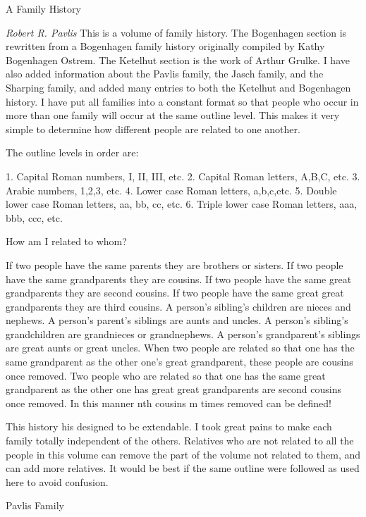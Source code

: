 \documentclass[a4paper]{article}
\begin{document}
{\noindent \Huge  A Family History}

{\it Robert R. Pavlis}
\vskip 6mm
	This is a volume of family history.  The Bogenhagen section is rewritten from a Bogenhagen family history originally compiled by Kathy Bogenhagen Ostrem.  The Ketelhut section is the work of Arthur Grulke.  I have also added information about the Pavlis family, the Jasch family, and the Sharping family, and added many entries to both the Ketelhut and Bogenhagen history.  I have put all families into a constant format so that people who occur in more than one family will occur at the same outline level.  This makes it very simple to determine how different people are related to one another.

\noindent   The outline levels in order are:

	1. Capital Roman numbers, I, II, III, etc.	
	2. Capital Roman letters, A,B,C, etc.
	3. Arabic numbers, 1,2,3, etc.
	4. Lower case Roman letters, a,b,c,etc.
	5. Double lower case Roman letters, aa, bb, cc, etc.
	6. Triple lower case Roman letters, aaa, bbb, ccc, etc.  
  
\noindent How am I related to whom?

	If two people have the same parents they are brothers or sisters.
	If two people have the same grandparents they are cousins.
	If two people have the same great grandparents they are second cousins.
	If two people have the same great great grandparents they are third cousins.  
	A person's sibling's children are nieces and nephews.
	A person's parent's siblings are aunts and uncles.
	A person's sibling's grandchildren are grandnieces or grandnephews.
	A person's grandparent's siblings are great aunts or great uncles.
	When two people are related so that one has the same grandparent as the other one's great grandparent, these people are cousins once removed.  
	Two people who are related so that one has the same great grandparent as the other one has great great grandparents are second cousins once removed.
	In this manner nth cousins m times removed can be defined!

	This history his designed to be extendable.  I took great pains to make each family totally independent of the others.  Relatives who are not related to all the people in this volume can remove the part of the volume not related to them, and can add more relatives.  It would be best if the same outline were followed as used here to avoid confusion.

\pagebreak

{\Huge \noindent Pavlis Family}
\vskip 5mm
\end{document}
